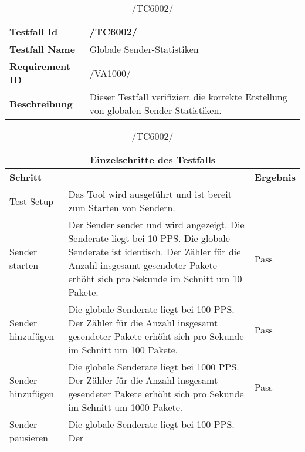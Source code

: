     \begin{table}[h]
        \caption{/TC6002/}
        \label{tab:TC6002}
        \begin{center}
            \begin{tabular}{|p{3.5cm}|p{12cm}|}
                \hline
                    \textbf{Testfall Id} & /TC6002/\\
                \hline
                    \textbf{Testfall Name} & Globale Sender-Statistiken\\
                \hline
                    \textbf{Requirement ID} & /VA1000/\\
                \hline
                    \textbf{Beschreibung} & Dieser Testfall verifiziert die
                    korrekte Erstellung von globalen Sender-Statistiken.\\
                \hline
            \end{tabular}
            \begin{tabular}{|p{2.5cm}|p{5cm}|p{7.55cm}|}
                \multicolumn{3}{|c|}{\textbf{Einzelschritte des Testfalls}} \\
                \hline
                    \textbf{Schritt} &  & \textbf{Ergebnis}\\
                \hline
                    Test-Setup & Das Tool
                    wird ausgeführt und ist bereit zum Starten von Sendern. \\
                \hline
                    Sender starten & Der Sender
                    sendet und wird angezeigt. Die Senderate liegt bei 10 PPS.
                    Die globale Senderate ist identisch. Der Zähler für die
                    Anzahl insgesamt gesendeter Pakete erhöht sich pro Sekunde
                    im Schnitt um 10 Pakete. & Pass\\
                \hline
                    Sender hinzufügen & Die globale Senderate
                    liegt bei 100 PPS. Der Zähler für die Anzahl insgesamt
                    gesendeter Pakete erhöht sich pro Sekunde im Schnitt um 100
                    Pakete. & Pass\\
                \hline
                    Sender hinzufügen & Die globale Senderate
                    liegt bei 1000 PPS. Der Zähler für die Anzahl insgesamt
                    gesendeter Pakete erhöht sich pro Sekunde im Schnitt um 1000
                    Pakete. & Pass\\
                \hline
                    Sender pausieren & Die globale Senderate liegt bei 100 PPS. Der

\end{tabular}
\end{center}
\end{table}
